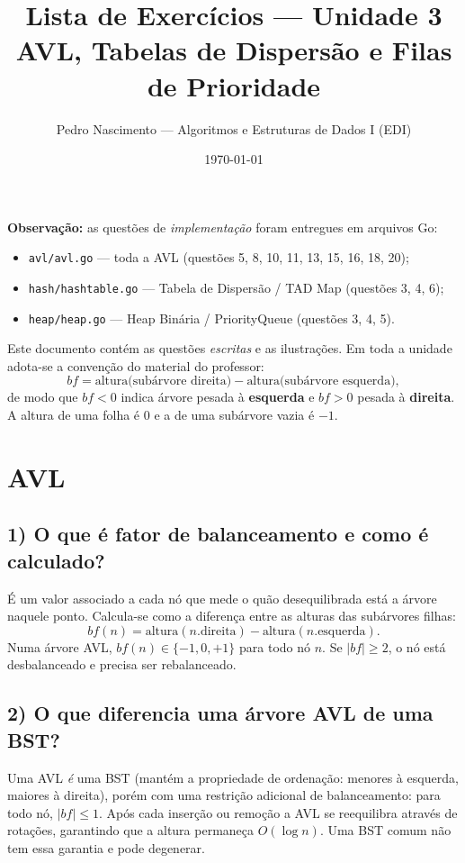 \documentclass[11pt,a4paper]{article}
\title{Lista de Exercícios --- Unidade 3\\\large AVL, Tabelas de Dispersão e Filas de Prioridade}
\author{Pedro Nascimento --- Algoritmos e Estruturas de Dados I (EDI)}
\date{\today}
\begin{document}
\maketitle

\noindent\textbf{Observação:} as questões de \emph{implementação} foram entregues em arquivos Go:
\begin{itemize}[noitemsep]
  \item \texttt{avl/avl.go} --- toda a AVL (questões 5, 8, 10, 11, 13, 15, 16, 18, 20);
  \item \texttt{hash/hashtable.go} --- Tabela de Dispersão / TAD Map (questões 3, 4, 6);
  \item \texttt{heap/heap.go} --- Heap Binária / PriorityQueue (questões 3, 4, 5).
\end{itemize}
Este documento contém as questões \emph{escritas} e as ilustrações. Em toda a unidade
adota-se a convenção do material do professor:
\[
  bf = \text{altura(subárvore direita)} - \text{altura(subárvore esquerda)},
\]
de modo que $bf<0$ indica árvore pesada à \textbf{esquerda} e $bf>0$ pesada à \textbf{direita}.
A altura de uma folha é $0$ e a de uma subárvore vazia é $-1$.

\section*{AVL}

\subsection*{1) O que é fator de balanceamento e como é calculado?}
É um valor associado a cada nó que mede o quão desequilibrada está a árvore naquele ponto.
Calcula-se como a diferença entre as alturas das subárvores filhas:
\[
  bf(n) = \text{altura}(n.\text{direita}) - \text{altura}(n.\text{esquerda}).
\]
Numa árvore AVL, $bf(n) \in \{-1, 0, +1\}$ para todo nó $n$. Se $|bf| \ge 2$, o nó está
desbalanceado e precisa ser rebalanceado.

\subsection*{2) O que diferencia uma árvore AVL de uma BST?}
Uma AVL \emph{é} uma BST (mantém a propriedade de ordenação: menores à esquerda, maiores
à direita), porém com uma restrição adicional de balanceamento: para todo nó, $|bf|\le 1$.
Após cada inserção ou remoção a AVL se reequilibra através de rotações, garantindo que a
altura permaneça $O(\log n)$. Uma BST comum não tem essa garantia e pode degenerar.
\end{document}

